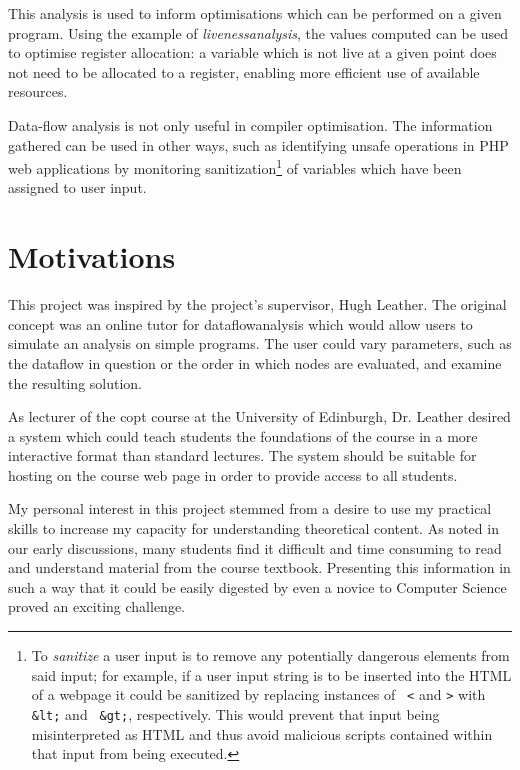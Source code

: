 \documentclass[bsc,twoside,singlespacing,parskip,logo,notimes,normalheadings]{infthesis}
\begin{document}
    This analysis is used to inform optimisations which can be
    performed on a given program. Using the example of {\em
      \gls{livenessanalysis}}, the values computed can be used to
    optimise register allocation: a variable which is not live at a
    given point does not need to be allocated to a register, enabling
    more efficient use of available resources.
    
    Data-flow analysis is not only useful in compiler
    optimisation. The information gathered can be used in other ways,
    such as identifying unsafe operations in PHP web
    applications\cite{TaintedFlow} by monitoring
    sanitization\footnote{To {\em sanitize} a user input is to remove
      any potentially dangerous elements from said input; for example,
      if a user input string is to be inserted into the HTML of a
      webpage it could be sanitized by replacing instances of {\tt
        \textless} and {\tt \textgreater} with {\tt \&lt;} and {\tt
        \&gt;}, respectively. This would prevent that input being
      misinterpreted as HTML and thus avoid malicious scripts
      contained within that input from being executed.} of variables
    which have been assigned to user input.


    \section{Motivations}
    This project was inspired by the project's supervisor, Hugh
    Leather. The original concept was an online tutor for
    \gls{dataflowanalysis} which would allow users to simulate an
    analysis on simple programs. The user could vary parameters, such
    as the \gls{dataflow} in question or the order in which nodes are
    evaluated, and examine the resulting solution.
    
    As lecturer of the \gls{copt} course at the University of
    Edinburgh, Dr. Leather desired a system which could teach students
    the foundations of the course in a more interactive format than
    standard lectures. The system should be suitable for hosting on
    the course web page in order to provide access to all students.
    
    My personal interest in this project stemmed from a desire to use
    my practical skills to increase my capacity for understanding
    theoretical content. As noted in our early discussions, many
    students find it difficult and time consuming to read and
    understand material from the course textbook. Presenting this
    information in such a way that it could be easily digested by even
    a novice to Computer Science proved an exciting challenge.
    
\end{document}
